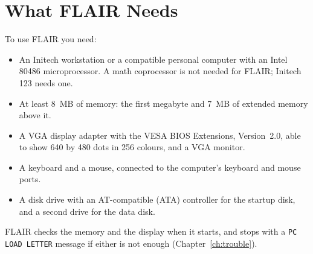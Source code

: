 \chapter{What FLAIR Needs}
To use FLAIR you need:
\begin{itemize}
\item An Initech workstation or a compatible personal computer with an
  Intel 80486 microprocessor.  A math coprocessor is not needed for FLAIR;
  Initech 123 needs one.
\item At least 8~MB of memory: the first megabyte and 7~MB of extended
  memory above it.
\item A VGA display adapter with the VESA BIOS Extensions, Version~2.0, able
  to show 640 by 480 dots in 256 colours, and a VGA monitor.
\item A keyboard and a mouse, connected to the computer's keyboard and
  mouse ports.
\item A disk drive with an AT-compatible (ATA) controller for the startup
  disk, and a second drive for the data disk.
\end{itemize}
FLAIR checks the memory and the display when it starts, and stops with a
\texttt{PC LOAD LETTER} message if either is not enough (Chapter~\ref{ch:trouble}).
